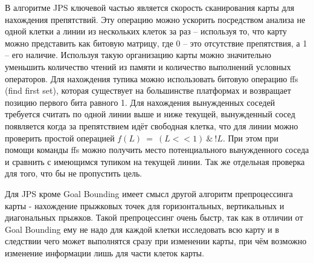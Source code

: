 В алгоритме JPS ключевой частью является скорость сканирования карты для нахождения препятствий. Эту операцию можно ускорить посредством анализа не одной клетки а линии из нескольких клеток за раз -- используя то, что карту можно представить как битовую матрицу, где 0 -- это отсутствие препятствия, а 1 -- его наличие. Используя такую организацию карты можно значительно уменьшить количество чтений из памяти и количество выполнений условных операторов. Для нахождения тупика можно использовать битовую операцию ffs (find first set), которая существует на большинстве платформах и возвращает позицию первого бита равного 1. Для нахождения вынужденных соседей требуется считать по одной линии выше и ниже текущей, вынужденный сосед появляется когда за препятствием идёт свободная клетка, что для линии можно проверить простой операцией $f(L)\ =\ (L<<1)\ \&\ !L$. При этом при помощи команды ffs можно получить место потенциального вынужденного соседа и сравнить с имеющимся тупиком на текущей линии. Так же отдельная проверка для того, что бы не пропустить цель.

Для JPS кроме Goal Bounding имеет смысл другой алгоритм препроцессинга карты - нахождение прыжковых точек для горизонтальных, вертикальных и диагональных прыжков. Такой препроцессинг очень быстр, так как в отличии от Goal Bounding ему не надо для каждой клетки исследовать всю карту и в следствии чего может выполнятся сразу при изменении карты, при чём возможно изменение информации лишь для части клеток карты.
